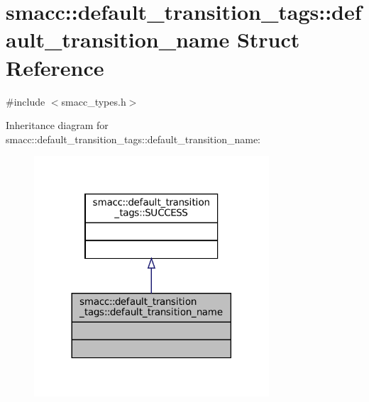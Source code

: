 \hypertarget{structsmacc_1_1default__transition__tags_1_1default__transition__name}{}\section{smacc\+:\+:default\+\_\+transition\+\_\+tags\+:\+:default\+\_\+transition\+\_\+name Struct Reference}
\label{structsmacc_1_1default__transition__tags_1_1default__transition__name}


{\ttfamily \#include $<$smacc\+\_\+types.\+h$>$}



Inheritance diagram for smacc\+:\+:default\+\_\+transition\+\_\+tags\+:\+:default\+\_\+transition\+\_\+name\+:
\nopagebreak
\begin{figure}[H]
\begin{center}
\leavevmode
\includegraphics[width=248pt]{structsmacc_1_1default__transition__tags_1_1default__transition__name__inherit__graph}
\end{center}
\end{figure}



